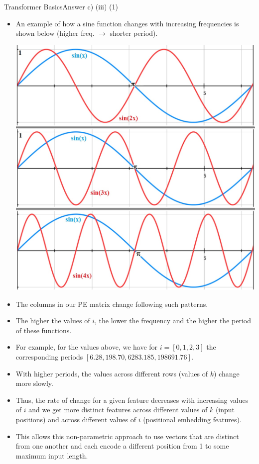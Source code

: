 \documentclass[t]{beamer}
\begin{document}
\begin{frame}{Transformer Basics}{Answer c) (iii) (1)}
    \begin{itemize}
        \item An example of how a sine function changes with increasing
              frequencies is shown below (higher freq. $\rightarrow$ shorter period).
              \begin{center}
                  \includegraphics[scale=0.3]{img/sinuscosinus_10.jpg}
              \end{center}
        \item The columns in our PE matrix change following such patterns.
        \item The higher the values of $i$, the lower the frequency and
              the higher the period of these functions.
        \item For example, for the values above, we have for
              $i = [0, 1, 2, 3]$ the corresponding periods
              $[6.28, 198.70, 6283.185, 198691.76]$.
        \item With higher periods, the values across different rows
              (values of $k$) change more slowly.
        \item Thus, the rate of change for a given feature decreases with
              increasing values of $i$ and we get more distinct features
              across different values of $k$ (input positions) and across
              different values of $i$ (positional embedding features).
        \item This allows this non-parametric approach to use vectors
              that are distinct from one another and each encode a
              different position from 1 to some maximum input length.


\end{itemize}
\end{frame}
\end{document}
